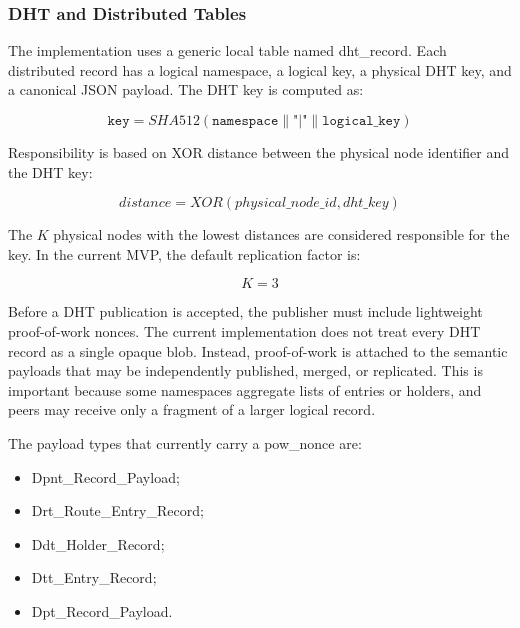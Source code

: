\documentclass[12pt]{article}
\newcommand{\codebreak}[1]{{\footnotesize\ttfamily #1}}
\begin{document}
\subsubsection{DHT and Distributed Tables}
\label{subsec:dht-implementation}

The implementation uses a generic local table named \codebreak{dht\_\allowbreak{}record}. Each distributed record has a logical namespace, a logical key, a physical DHT key, and a canonical JSON payload. The DHT key is computed as:

\begin{equation}
    \texttt{key} = SHA512(\texttt{namespace} \parallel \texttt{"|"} \parallel \texttt{logical\_key})
\end{equation}

Responsibility is based on XOR distance between the physical node identifier and the DHT key:

\begin{equation}
    distance = XOR(physical\_node\_id, dht\_key)
\end{equation}

The $K$ physical nodes with the lowest distances are considered responsible for the key. In the current MVP, the default replication factor is:

\begin{equation}
    K = 3
\end{equation}

Before a DHT publication is accepted, the publisher must include lightweight proof-of-work nonces. The current implementation does not treat every DHT record as a single opaque blob. Instead, proof-of-work is attached to the semantic payloads that may be independently published, merged, or replicated. This is important because some namespaces aggregate lists of entries or holders, and peers may receive only a fragment of a larger logical record.

The payload types that currently carry a \codebreak{pow\_\allowbreak{}nonce} are:

\begin{itemize}
    \item \codebreak{Dpnt\_\allowbreak{}Record\_\allowbreak{}Payload};
    \item \codebreak{Drt\_\allowbreak{}Route\_\allowbreak{}Entry\_\allowbreak{}Record};
    \item \codebreak{Ddt\_\allowbreak{}Holder\_\allowbreak{}Record};
    \item \codebreak{Dtt\_\allowbreak{}Entry\_\allowbreak{}Record};
    \item \codebreak{Dpt\_\allowbreak{}Record\_\allowbreak{}Payload}.
\end{itemize}
\end{document}
